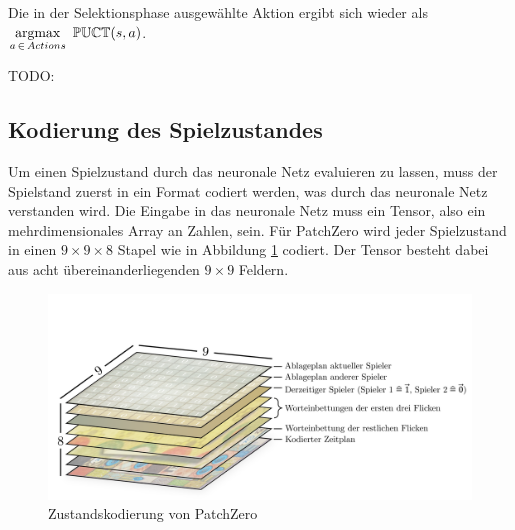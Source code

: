 Die in der Selektionsphase ausgewählte Aktion ergibt sich wieder als $\argmax\limits_{a\, \in\, Actions}\ \mathbb{PUCT}(s,a)$.

TODO:

\subsection{Kodierung des Spielzustandes}

Um einen Spielzustand durch das neuronale Netz evaluieren zu lassen, muss der Spielstand zuerst in ein Format codiert werden, was durch das neuronale Netz verstanden wird. Die Eingabe in das neuronale Netz muss ein Tensor, also ein mehrdimensionales Array an Zahlen, sein. Für PatchZero wird jeder Spielzustand in einen $9\times 9\times 8$ Stapel wie in Abbildung \ref{fig:patch-zero-state} codiert. Der Tensor besteht dabei aus acht übereinanderliegenden $9\times 9$ Feldern.

\begin{figure}[!ht]
    \centering
    \vspace*{-1.75cm}
    \includegraphics[width=\textwidth]{res/pictures/patch-zero-state.pdf}
    \caption{Zustandskodierung von PatchZero}
    \label{fig:patch-zero-state}
\end{figure}


